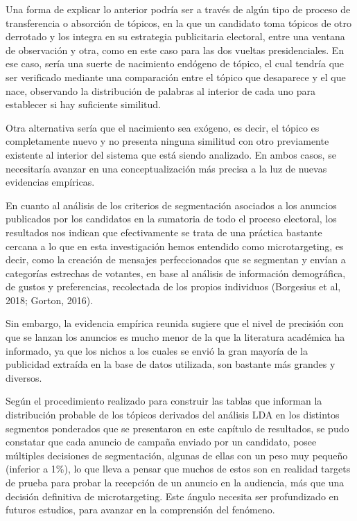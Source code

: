 \documentclass[
  10pt,
  letterpaper,
]{report}
\begin{document}
Una forma de explicar lo anterior podría ser a través de algún tipo de
proceso de transferencia o absorción de tópicos, en la que un candidato
toma tópicos de otro derrotado y los integra en su estrategia
publicitaria electoral, entre una ventana de observación y otra, como en
este caso para las dos vueltas presidenciales. En ese caso, sería una
suerte de nacimiento endógeno de tópico, el cual tendría que ser
verificado mediante una comparación entre el tópico que desaparece y el
que nace, observando la distribución de palabras al interior de cada uno
para establecer si hay suficiente similitud.

Otra alternativa sería que el nacimiento sea exógeno, es decir, el
tópico es completamente nuevo y no presenta ninguna similitud con otro
previamente existente al interior del sistema que está siendo analizado.
En ambos casos, se necesitaría avanzar en una conceptualización más
precisa a la luz de nuevas evidencias empíricas.

En cuanto al análisis de los criterios de segmentación asociados a los
anuncios publicados por los candidatos en la sumatoria de todo el
proceso electoral, los resultados nos indican que efectivamente se trata
de una práctica bastante cercana a lo que en esta investigación hemos
entendido como microtargeting, es decir, como la creación de mensajes
perfeccionados que se segmentan y envían a categorías estrechas de
votantes, en base al análisis de información demográfica, de gustos y
preferencias, recolectada de los propios individuos (Borgesius et al,
2018; Gorton, 2016).

Sin embargo, la evidencia empírica reunida sugiere que el nivel de
precisión con que se lanzan los anuncios es mucho menor de la que la
literatura académica ha informado, ya que los nichos a los cuales se
envió la gran mayoría de la publicidad extraída en la base de datos
utilizada, son bastante más grandes y diversos.

Según el procedimiento realizado para construir las tablas que informan
la distribución probable de los tópicos derivados del análisis LDA en
los distintos segmentos ponderados que se presentaron en este capítulo
de resultados, se pudo constatar que cada anuncio de campaña enviado por
un candidato, posee múltiples decisiones de segmentación, algunas de
ellas con un peso muy pequeño (inferior a 1\%), lo que lleva a pensar
que muchos de estos son en realidad targets de prueba para probar la
recepción de un anuncio en la audiencia, más que una decisión definitiva
de microtargeting. Este ángulo necesita ser profundizado en futuros
estudios, para avanzar en la comprensión del fenómeno.
\end{document}
